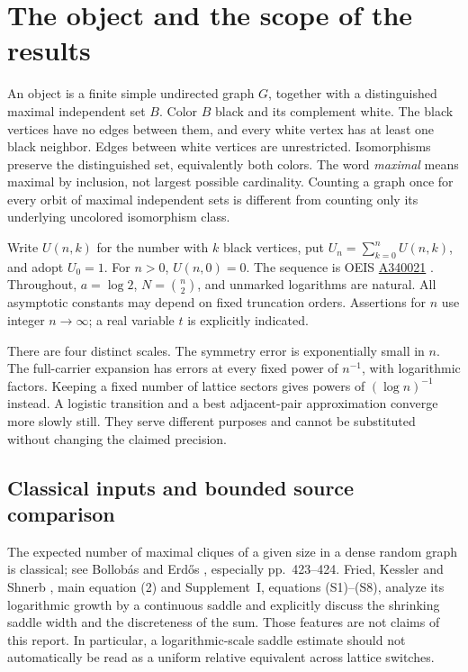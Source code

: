 \documentclass[11pt]{article}
\theoremstyle{remark}\newtheorem{remark}[theorem]{Remark}
\begin{document}
\section{The object and the scope of the results}\label{mis:sec:scope}%
An object is a finite simple undirected graph $G$, together with a distinguished maximal independent set $B$. Color $B$ black and its complement white. The black vertices have no edges between them, and every white vertex has at least one black neighbor. Edges between white vertices are unrestricted. Isomorphisms preserve the distinguished set, equivalently both colors. The word \emph{maximal} means maximal by inclusion, not largest possible cardinality. Counting a graph once for every orbit of maximal independent sets is different from counting only its underlying uncolored isomorphism class.

Write $U(n,k)$ for the number with $k$ black vertices, put $U_n=\sum_{k=0}^n U(n,k)$, and adopt $U_0=1$. For $n>0$, $U(n,0)=0$. The sequence is OEIS \href{https://oeis.org/A340021}{A340021} \cite{oeis}. Throughout, $a=\log 2$, $N=\binom n2$, and unmarked logarithms are natural. All asymptotic constants may depend on fixed truncation orders. Assertions for $n$ use integer $n\to\infty$; a real variable $t$ is explicitly indicated.

There are four distinct scales. The symmetry error is exponentially small in $n$. The full-carrier expansion has errors at every fixed power of $n^{-1}$, with logarithmic factors. Keeping a fixed number of lattice sectors gives powers of $(\log n)^{-1}$ instead. A logistic transition and a best adjacent-pair approximation converge more slowly still. They serve different purposes and cannot be substituted without changing the claimed precision.

\subsection{Classical inputs and bounded source comparison}
The expected number of maximal cliques of a given size in a dense random graph is classical; see Bollob\'as and Erd\H{o}s \cite{be}, especially pp.~423--424. Fried, Kessler and Shnerb \cite{fks}, main equation (2) and Supplement~I, equations (S1)--(S8), analyze its logarithmic growth by a continuous saddle and explicitly discuss the shrinking saddle width and the discreteness of the sum. Those features are not claims of this report. In particular, a logarithmic-scale saddle estimate should not automatically be read as a uniform relative equivalent across lattice switches.
\end{document}
